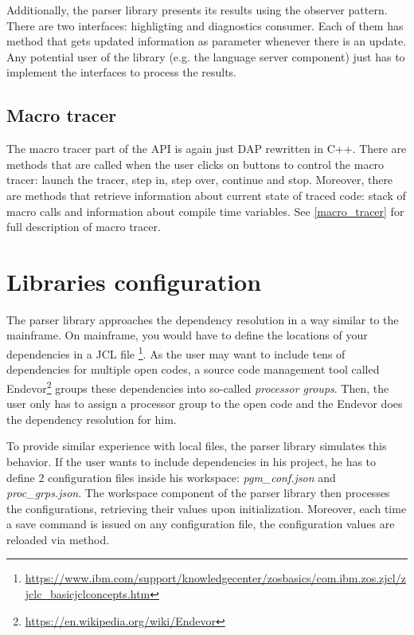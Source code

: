 Additionally, the parser library presents its results using the observer pattern. There are two interfaces: highligting and diagnostics consumer. Each of them has method  that gets updated information as parameter whenever there is an update. Any potential user of the library (e.g. the language server component) just has to implement the interfaces to process the results.

\subsection{Macro tracer}

The macro tracer part of the API is again just DAP rewritten in C++. There are methods that are called when the user clicks on buttons to control the macro tracer: launch the tracer, step in, step over, continue and stop. Moreover, there are methods that retrieve information about current state of traced code: stack of macro calls and information about compile time variables. See \cref{macro_tracer} for full description of macro tracer.

\section{Libraries configuration}
\label{libs_config}
The parser library approaches the dependency resolution in a way similar to the mainframe. On mainframe, you would have to define the locations of your dependencies in a JCL file \footnote{\url{https://www.ibm.com/support/knowledgecenter/zosbasics/com.ibm.zos.zjcl/zjclc_basicjclconcepts.htm}}. As the user may want to include tens of dependencies for multiple open codes, a source code management tool called Endevor\footnote{\url{https://en.wikipedia.org/wiki/Endevor}} groups these dependencies into so-called \emph{processor groups}. Then, the user only has to assign a processor group to the open code and the Endevor does the dependency resolution for him.

To provide similar experience with local files, the parser library simulates this behavior. If the user wants to include dependencies in his project, he has to define 2 configuration files inside his workspace: \emph{pgm\_conf.json} and \emph{proc\_grps.json}. The workspace component of the parser library then processes the configurations, retrieving their values upon initialization. Moreover, each time a save command is issued on any configuration file, the configuration values are reloaded via  method.


